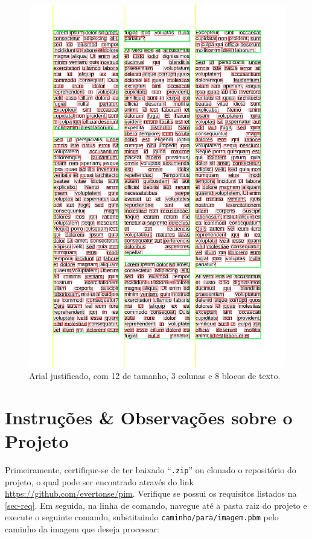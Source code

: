 \documentclass[english, 
               brazil, 
               bsc] %
               {dcomp-abntex2}
\begin{document}
\begin{figure}[htb]
        \caption{\label{arial} \small Arial justificado, com 12 de tamanho, 3 colunas e 8 blocos de texto.}
        \begin{center}
            \includegraphics[scale=0.25]{./images/arial_justificado_tamanho_12_colunas_3_blocos_8_linhas_52_palavras_557.png}
        \end{center}
\end{figure}


\chapter{Instruções \& Observações sobre o Projeto}
\label{ch-notas}

Primeiramente, certifique-se de ter baixado ``\texttt{.zip}'' ou clonado o repositório do projeto, o qual pode ser encontrado através do link \url{https://github.com/evertonse/pim}. Verifique se possui os requisitos listados na \autoref{sec-req}. Em seguida, na linha de comando, navegue até a pasta raiz do projeto e execute o seguinte comando, substituindo \texttt{caminho/para/imagem.pbm} pelo caminho da imagem que deseja processar:
\end{document}
